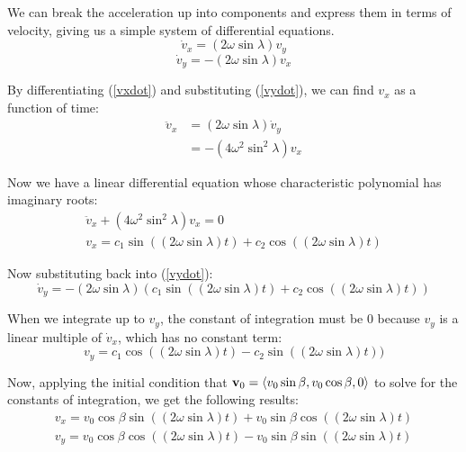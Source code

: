 \documentclass{article}
\begin{document}
We can break the acceleration up into components and express them in terms of velocity, giving us a simple system of differential equations.
\begin{equation}\label{vxdot}
\dot{v}_x = (2\omega\sin\lambda)v_y
\end{equation}
\begin{equation}\label{vydot}
\dot{v}_y = -(2\omega\sin\lambda)v_x
\end{equation}

By differentiating (\ref{vxdot}) and substituting (\ref{vydot}), we can find $v_x$ as a function of time:
\begin{equation*}
\begin{aligned}
\ddot{v}_x &= (2\omega\sin\lambda)\dot{v}_y \\
&= -(4\omega^2\sin^2\lambda)v_x
\end{aligned}
\end{equation*}

Now we have a linear differential equation whose characteristic polynomial has imaginary roots:
\begin{equation*}
\begin{gathered}
\ddot{v}_x + (4\omega^2\sin^2\lambda)v_x = 0 \\
v_x = c_1\sin((2\omega\sin\lambda)t) + c_2\cos((2\omega\sin\lambda)t)
\end{gathered}
\end{equation*}

Now substituting back into (\ref{vydot}):
\begin{equation*}
\dot{v}_y = -(2\omega\sin\lambda)(c_1\sin((2\omega\sin\lambda)t) + c_2\cos((2\omega\sin\lambda)t))
\end{equation*}

When we integrate up to $v_y$, the constant of integration must be $0$ because $v_y$ is a linear multiple of $\dot{v}_x$, which has no constant term:
\begin{equation*}
v_y = c_1\cos((2\omega\sin\lambda)t) - c_2\sin((2\omega\sin\lambda)t))
\end{equation*}

Now, applying the initial condition that $\vb{v}_0 = \langle v_0\sin\beta, v_0\cos\beta, 0\rangle$ to solve for the constants of integration, we get the following results:
\begin{equation}
\begin{gathered}
v_x = v_0\cos\beta\sin((2\omega\sin\lambda)t) + v_0\sin\beta\cos((2\omega\sin\lambda)t) \\
v_y = v_0\cos\beta\cos((2\omega\sin\lambda)t) - v_0\sin\beta\sin((2\omega\sin\lambda)t)
\end{gathered}
\end{equation}
\end{document}
